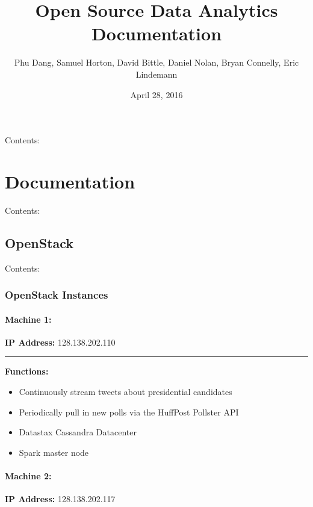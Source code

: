\documentclass[letterpaper,12pt,english]{sphinxmanual}
\title{Open Source Data Analytics Documentation}
\date{April 28, 2016}
\author{Phu Dang, Samuel Horton, David Bittle, Daniel Nolan, Bryan Connelly, Eric Lindemann}
\begin{document}
\maketitle
\tableofcontents
{}\label{index::doc}


Contents:


\chapter{Documentation}
\label{documentation::doc}\label{documentation:documentation}\label{documentation:welcome-to-team-osam-s-project-documentation}
Contents:


\section{OpenStack}
\label{openStack:openstack}\label{openStack::doc}
Contents:


\subsection{OpenStack Instances}
\label{instances:openstack-instances}\label{instances::doc}

\subsubsection{\textbf{Machine 1:}}
\label{instances:machine-info}\label{instances:machine-1}
\textbf{IP Address:} 128.138.202.110


\bigskip\hrule{}\bigskip


\textbf{Functions:}
\begin{itemize}
\item {} 
Continuously stream tweets about presidential candidates

\item {} 
Periodically pull in new polls via the HuffPost Pollster API

\item {} 
Datastax Cassandra Datacenter

\item {} 
Spark master node

\end{itemize}


\subsubsection{\textbf{Machine 2:}}
\label{instances:machine-2}
\begin{DUlineblock}{0em}
\item[] \textbf{IP Address:} 128.138.202.117
\end{DUlineblock}
\end{document}
